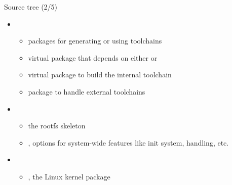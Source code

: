 \begin{frame}{Source tree (2/5)}
  \begin{itemize}
  \item {}
    \begin{itemize}
    \item packages for generating or using toolchains
    \item {} virtual package that depends on either
       or 
    \item {} virtual package to build the
      internal toolchain
    \item {} package to handle external
      toolchains
    \end{itemize}
  \item {}
    \begin{itemize}
    \item {} the rootfs skeleton
    \item {}, options for system-wide features like
      init system,  handling, etc.
    \end{itemize}
  \item {}
    \begin{itemize}
    \item {}, the Linux kernel package
    \end{itemize}
  \end{itemize}
\end{frame}

